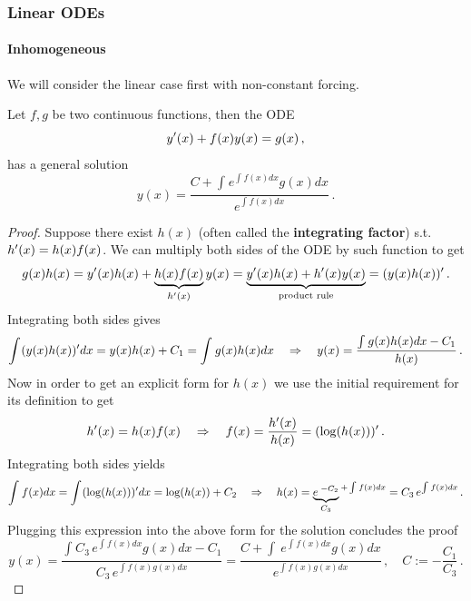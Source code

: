 \documentclass[../main.tex]{subfiles}
\begin{document}
\subsubsection{Linear ODEs}\label{subsubsec1.2.0}
\paragraph{Inhomogeneous}
We will consider the linear case first with non-constant forcing.
\begin{theorem}[label=thm1.2.1]{}{}
     Let $f,g$ be two continuous functions, then the ODE
     \begin{equation*}
          y'(x) + f(x)y(x) = g(x)\,,
     \end{equation*}
     has a general solution
     \begin{equation*}
          y(x) = \frac{C + \int_{}^{}e^{\int_{}^{}f(x)dx}g(x)dx}{e^{\int_{}^{}f(x)dx}} \,. 
     \end{equation*}
\end{theorem}
\begin{proof}
     Suppose there exist $h(x)$ (often called the \textbf{integrating factor}) s.t. $h'(x)=h(x)f(x)$. 
     We can multiply both sides of the ODE by such function to get
     \begin{equation*}
             g(x)h(x) = y'(x)h(x)+\underbrace{h(x)f(x)}_{h'(x)}y(x) = \underbrace{y'(x)h(x)+h'(x)y(x)}_{\text{product rule}} = (y(x)h(x))'\,.
     \end{equation*}
Integrating both sides gives
\begin{equation*}
        \int_{}^{}(y(x)h(x))'dx = y(x)h(x) + C_{1} = \int_{}^{}g(x)h(x)dx\quad\Rightarrow\quad y(x) = \frac{\int_{}^{}g(x)h(x)dx - C_{1}}{h(x)}\,.
\end{equation*}
Now in order to get an explicit form for $h(x)$ we use the initial requirement for its definition to get
\begin{equation*}
     h'(x)=h(x)f(x) \quad\Rightarrow\quad f(x)=\frac{h'(x)}{h(x)}=(\log(h(x)))'\,.
\end{equation*}
Integrating both sides yields
\begin{equation*}
\int_{}^{}f(x)dx=\int_{}^{}(\log(h(x)))'dx = \log(h(x)) + C_{2}\quad\Rightarrow\quad h(x) = \underbrace{e^{\;-C_{2}}}_{C_{3}}{}^{+\int_{}^{}f(x)dx} = C_{3}\,e^{\int_{}^{}f(x)dx}\,.
\end{equation*}
Plugging this expression into the above form for the solution concludes the proof
\begin{equation*}
        y(x) = \frac{\int_{}^{}C_{3}\,e^{\int_{}^{}f(x)dx}g(x)dx-C_{1}}{C_{3}\,e^{\int_{}^{}f(x)g(x)dx}} = \frac{C+\int_{}^{}\,e^{\int_{}^{}f(x)dx}g(x)dx}{e^{\int_{}^{}f(x)g(x)dx}}\,,\quad C:=-\frac{C_{1}}{C_{3}}\,.
\end{equation*}
\end{proof}
\end{document}
